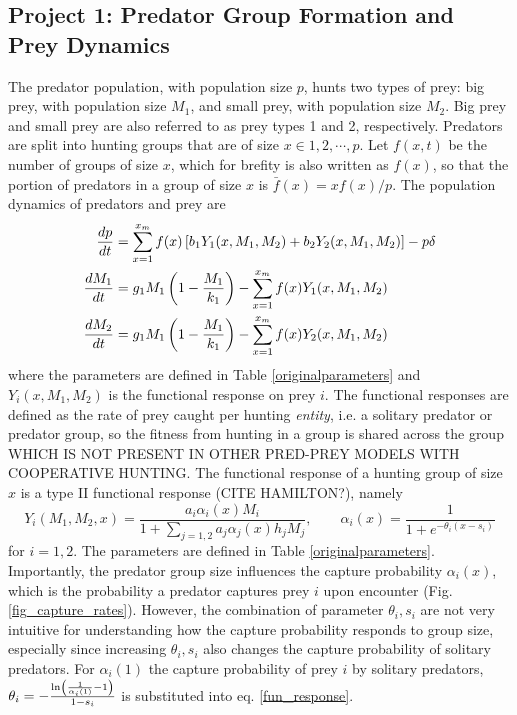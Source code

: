 \subsection{Project 1: Predator Group Formation and Prey Dynamics}
The predator population, with population size $p$, hunts two types of prey: big prey, with population size $M_1$, and small prey, with population size $M_2$. Big prey and small prey are also referred to as prey types 1 and 2, respectively. Predators are split into hunting groups that are of size $x \in 1, 2, \cdots, p$. Let $f(x,t)$ be the number of groups of size $x$, which for brefity is also written as $f(x)$, so that the portion of predators in a group of size $x$ is $\bar{f}(x) = x f(x)/p$. The population dynamics of predators and prey are 
\begin{subequations} \label{general_model}
\begin{align}
\frac{dp}{dt} &=  \sum_{x=1}^{x_{m}} f(x) \left[ b_1 Y_1(x,M_1,M_2) + b_2 Y_2(x,M_1,M_2) \right] - p \delta \\
\frac{dM_1}{dt} &= g_1 M_1 \left( 1 - \frac{M_1}{k_1} \right)  -  \sum_{x=1}^{x_{m}} f(x) Y_1(x,M_1,M_2) \\
\frac{dM_2}{dt} &= g_1 M_1 \left( 1 - \frac{M_1}{k_1} \right)  -  \sum_{x=1}^{x_{m}} f(x) Y_2(x,M_1,M_2)
\end{align}
\end{subequations}
where the parameters are defined in Table \ref{originalparameters} and $Y_i(x,M_1,M_2)$ is the functional response on prey $i$. The functional responses are defined as the rate of prey caught per hunting \textit{entity}, i.e. a solitary predator or predator group, so the fitness from hunting in a group is shared across the group WHICH IS NOT PRESENT IN OTHER PRED-PREY MODELS WITH COOPERATIVE HUNTING. The functional response of a hunting group of size $x$ is a type II functional response (CITE HAMILTON?), namely
\begin{equation} \label{fun_response}
Y_i(M_1, M_2, x) = \frac{a_i \alpha_i(x) M_i}{1 + \sum_{j=1,2} a_j \alpha_j(x) h_j M_j}, \qquad \alpha_i(x) = \frac{1}{1 + e^{-\theta_i(x - s_i)}}
\end{equation}	
for $i = 1,2$. The parameters are defined in Table \ref{originalparameters}. Importantly, the predator group size influences the capture probability $\alpha_i(x)$, which is the probability a predator captures prey $i$ upon encounter (Fig. \ref{fig_capture_rates}). However, the combination of parameter $\theta_i, s_i$ are not very intuitive for understanding how the capture probability responds to group size, especially since increasing $\theta_i, s_i$ also changes the capture probability of solitary predators. For $\alpha_{i}(1)$ the capture probability of prey $i$ by solitary predators, $\theta_i = - \frac{\ln\left(  \frac{1}{\alpha_i(1)} -1  \right)}{1 - s_i}$ is substituted into eq. \ref{fun_response}.

